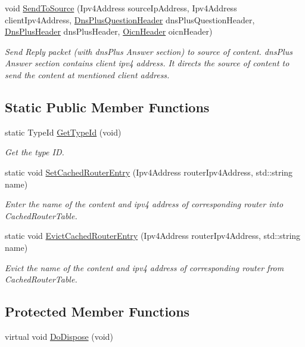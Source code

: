 \begin{DoxyCompactItemize}
$$void \hyperlink{classns3_1_1IcnManager_af503cd858bfb757c2eb55b25876d9cb2}{Send\-To\-Source} (Ipv4\-Address source\-Ip\-Address, Ipv4\-Address client\-Ipv4\-Address, \hyperlink{classns3_1_1DnsPlusQuestionHeader}{Dns\-Plus\-Question\-Header} dns\-Plus\-Question\-Header, \hyperlink{classns3_1_1DnsPlusHeader}{Dns\-Plus\-Header} dns\-Plus\-Header, \hyperlink{classns3_1_1OicnHeader}{Oicn\-Header} oicn\-Header)
\begin{DoxyCompactList}\small\item\em Send Reply packet (with dns\-Plus Answer section) to source of content. dns\-Plus Answer section contains client ipv4 address. It directs the source of content to send the content at mentioned client address. \end{DoxyCompactList}\end{DoxyCompactItemize}
\subsection*{Static Public Member Functions}
\begin{DoxyCompactItemize}
\item 
static Type\-Id \hyperlink{classns3_1_1IcnManager_afbbd24928df50c3489f381f1848dddf1}{Get\-Type\-Id} (void)
\begin{DoxyCompactList}\small\item\em Get the type I\-D. \end{DoxyCompactList}\item 
static void \hyperlink{classns3_1_1IcnManager_a799aa85b5dbecb91214d0e6c52fc697c}{Set\-Cached\-Router\-Entry} (Ipv4\-Address router\-Ipv4\-Address, std\-::string name)
\begin{DoxyCompactList}\small\item\em Enter the name of the content and ipv4 address of corresponding router into Cached\-Router\-Table. \end{DoxyCompactList}\item 
static void \hyperlink{classns3_1_1IcnManager_a61f9b8234e2f57bcc5d4d410423dfda6}{Evict\-Cached\-Router\-Entry} (Ipv4\-Address router\-Ipv4\-Address, std\-::string name)
\begin{DoxyCompactList}\small\item\em Evict the name of the content and ipv4 address of corresponding router from Cached\-Router\-Table. \end{DoxyCompactList}\end{DoxyCompactItemize}
\subsection*{Protected Member Functions}
\begin{DoxyCompactItemize}
\item 
virtual void \hyperlink{classns3_1_1IcnManager_ad7e1a50c5d1411ae7e73a489be9c1503}{Do\-Dispose} (void)
\end{DoxyCompactItemize}
